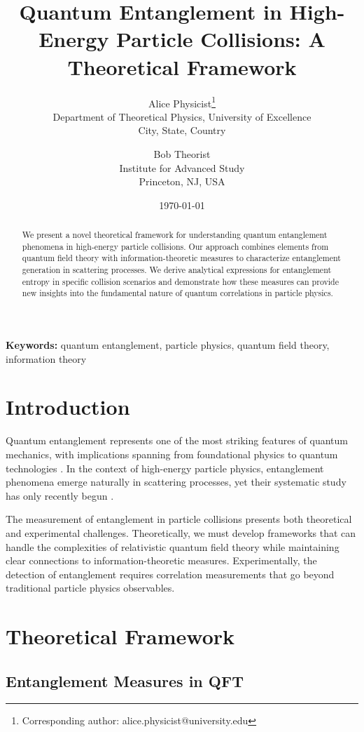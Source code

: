 \documentclass[arxiv,final,oneside,onecolumn]{../../arxiv-preprint}
\title{Quantum Entanglement in High-Energy Particle Collisions: A Theoretical Framework}
\author{%
    Alice Physicist\thanks{Corresponding author: alice.physicist@university.edu}\\
    \small Department of Theoretical Physics, University of Excellence\\
    \small City, State, Country\\
    \and
    Bob Theorist\\
    \small Institute for Advanced Study\\
    \small Princeton, NJ, USA
}
\date{\today}
\begin{document}
\maketitle

\begin{abstract}
We present a novel theoretical framework for understanding quantum entanglement 
phenomena in high-energy particle collisions. Our approach combines elements 
from quantum field theory with information-theoretic measures to characterize 
entanglement generation in scattering processes. We derive analytical expressions 
for entanglement entropy in specific collision scenarios and demonstrate how 
these measures can provide new insights into the fundamental nature of 
quantum correlations in particle physics.
\end{abstract}

\noindent\textbf{Keywords:} quantum entanglement, particle physics, quantum field theory, information theory

\section{Introduction}

Quantum entanglement represents one of the most striking features of quantum mechanics, 
with implications spanning from foundational physics to quantum technologies 
\cite{einstein1935, bell1964, aspect1982}. In the context of high-energy particle 
physics, entanglement phenomena emerge naturally in scattering processes, yet their 
systematic study has only recently begun \cite{horodecki2009, wilde2013}.

The measurement of entanglement in particle collisions presents both theoretical 
and experimental challenges. Theoretically, we must develop frameworks that can 
handle the complexities of relativistic quantum field theory while maintaining 
clear connections to information-theoretic measures. Experimentally, the detection 
of entanglement requires correlation measurements that go beyond traditional 
particle physics observables.

\section{Theoretical Framework}

\subsection{Entanglement Measures in QFT}
\end{document}

